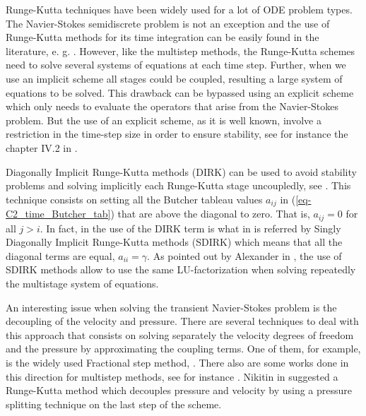 Runge-Kutta techniques have been widely used for a lot of ODE problem types. The Navier-Stokes semidiscrete problem is not an exception and the use of Runge-Kutta methods for its time integration can be easily found in the literature, e. g. \cite{benjamin_sanderse_energy-conserving_2013,nikitin_third-order-accurate_2006,sanderse_energy-conserving_2013,sanderse_accuracy_2012,sterner_semi-implicit_1997}. However, like the multistep methods, the Runge-Kutta schemes need to solve several systems of equations at each time step. Further, when we use an implicit scheme all stages could be coupled, resulting a large system of equations to be solved. This drawback can be bypassed using an explicit scheme which only needs to evaluate the operators that arise from the Navier-Stokes problem. But the use of an explicit scheme, as it is well known, involve a restriction in the time-step size in order to ensure stability, see for instance the chapter IV.2 in \cite{hairer_solving_1993}. 

Diagonally Implicit Runge-Kutta methods (DIRK) can be used to avoid stability problems and solving implicitly each Runge-Kutta stage uncoupledly, see \cite{alexander_diagonally_1977}. This technique consists on setting all the Butcher tableau values $a_{ij}$ in (\ref{eq-C2_time_Butcher_tab}) that are above the diagonal to zero. That is, $a_{ij} = 0$ for all $j>i$. In fact, in \cite{alexander_diagonally_1977} the use of the DIRK term is what in \cite{hairer_solving_1993} is referred by Singly Diagonally Implicit Runge-Kutta methods (SDIRK) which means that all the diagonal terms are equal, $a_{ii}=\gamma$. As pointed out by Alexander in \cite{alexander_diagonally_1977}, the use of SDIRK methods allow to use the same LU-factorization when solving repeatedly the multistage system of equations.

An interesting issue when solving the transient Navier-Stokes problem is the decoupling of the velocity and pressure. There are several techniques to deal with this approach that consists on solving separately the velocity degrees of freedom and the pressure by approximating the coupling terms. One of them, for example, is the widely used Fractional step method, \cite{donea_finite_1982}. There also are some works done in this direction for multistep methods, see for instance \cite{kim_application_1985}. Nikitin in \cite{nikitin_third-order-accurate_2006} suggested a Runge-Kutta method which decouples pressure and velocity by using a pressure splitting technique on the last step of the scheme.


